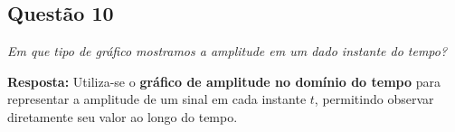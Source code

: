 \subsection*{Questão 10}

\textit{Em que tipo de gráfico mostramos a amplitude em um dado instante do tempo?}

\textbf{Resposta:}
Utiliza-se o \textbf{gráfico de amplitude no domínio do tempo} para representar a amplitude de um sinal em cada instante $t$,
permitindo observar diretamente seu valor ao longo do tempo.